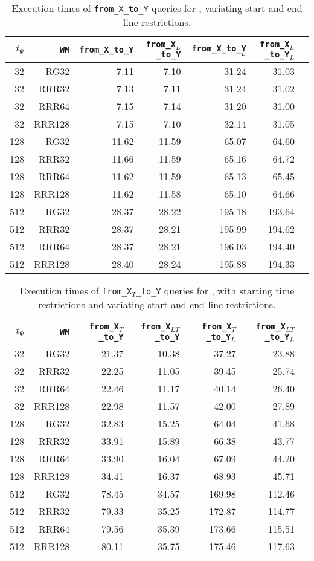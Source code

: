 \begin{table}[hbpt!]
\caption{Execution times of \texttt{from\_X\_to\_Y} queries for \ttctr, variating start and end line restrictions.}
\begin{tabular}{|r|r|r|r|r|r|r|}
\hline
$t_{\Psi}$ & \texttt{WM} & \texttt{from\_X\_to\_Y} & \texttt{from\_X$_{L}$\_to\_Y} & \texttt{from\_X\_to\_Y$_{L}$} & \texttt{from\_X$_{L}$\_to\_Y$_{L}$} \\
\hline
32 & RG32 & 7.11 & 7.10 & 31.24 & 31.03 \\
32 & RRR32 & 7.13 & 7.11 & 31.24 & 31.02 \\
32 & RRR64 & 7.15 & 7.14 & 31.20 & 31.00 \\
32 & RRR128 & 7.15 & 7.10 & 32.14 & 31.05 \\
128 & RG32 & 11.62 & 11.59 & 65.07 & 64.60 \\
128 & RRR32 & 11.66 & 11.59 & 65.16 & 64.72 \\
128 & RRR64 & 11.62 & 11.59 & 65.13 & 65.45 \\
128 & RRR128 & 11.62 & 11.58 & 65.10 & 64.66 \\
512 & RG32 & 28.37 & 28.22 & 195.18 & 193.64 \\
512 & RRR32 & 28.37 & 28.21 & 195.99 & 194.62 \\
512 & RRR64 & 28.37 & 28.21 & 196.03 & 194.40 \\
512 & RRR128 & 28.40 & 28.24 & 195.88 & 194.33 \\
\hline
\end{tabular}
\end{table}

\begin{table}[hbpt!]
\caption{Execution times of \texttt{from\_X$_T$\_to\_Y} queries for \ttctr, with starting time restrictions and variating start and end line restrictions.}
\begin{tabular}{|r|r|r|r|r|r|r|}
\hline
$t_{\Psi}$ & \texttt{WM} & \texttt{from\_X$_{T}$\_to\_Y} & \texttt{from\_X$_{LT}$\_to\_Y} & \texttt{from\_X$_{T}$\_to\_Y$_{L}$} & \texttt{from\_X$_{LT}$\_to\_Y$_{L}$} \\
\hline
32 & RG32 & 21.37 & 10.38 & 37.27 & 23.88 \\
32 & RRR32 & 22.25 & 11.05 & 39.45 & 25.74 \\
32 & RRR64 & 22.46 & 11.17 & 40.14 & 26.40 \\
32 & RRR128 & 22.98 & 11.57 & 42.00 & 27.89 \\
128 & RG32 & 32.83 & 15.25 & 64.04 & 41.68 \\
128 & RRR32 & 33.91 & 15.89 & 66.38 & 43.77 \\
128 & RRR64 & 33.90 & 16.04 & 67.09 & 44.20 \\
128 & RRR128 & 34.41 & 16.37 & 68.93 & 45.71 \\
512 & RG32 & 78.45 & 34.57 & 169.98 & 112.46 \\
512 & RRR32 & 79.33 & 35.25 & 172.87 & 114.77 \\
512 & RRR64 & 79.56 & 35.39 & 173.66 & 115.51 \\
512 & RRR128 & 80.11 & 35.75 & 175.46 & 117.63 \\
\hline
\end{tabular}
\end{table}

